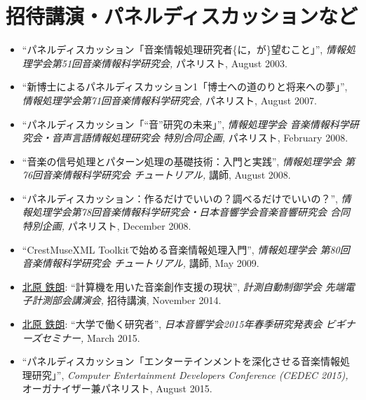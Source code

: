   \section*{招待講演・パネルディスカッションなど}
   \begin{itemize}
   
\item 

    ``パネルディスカッション「音楽情報処理研究者\{に，が\}望むこと」'', 
    {\it 情報処理学会第51回音楽情報科学研究会,
    } パネリスト, August 2003. 

\item 

    ``新博士によるパネルディスカッション1「博士への道のりと将来への夢」'', 
    {\it 情報処理学会第71回音楽情報科学研究会,
    } パネリスト, August 2007. 

\item 

    ``パネルディスカッション「``音''研究の未来」'', 
    {\it 情報処理学会 音楽情報科学研究会・音声言語情報処理研究会 特別合同企画,
    } パネリスト, February 2008. 

\item 

    ``音楽の信号処理とパターン処理の基礎技術：入門と実践'', 
    {\it 情報処理学会 第76回音楽情報科学研究会 チュートリアル,
    } 講師, August 2008. 

\item 

    ``パネルディスカッション：作るだけでいいの？調べるだけでいいの？'', 
    {\it 情報処理学会第78回音楽情報科学研究会・日本音響学会音楽音響研究会 合同特別企画,
    } パネリスト, December 2008. 

\item 

    ``CrestMuseXML Toolkitで始める音楽情報処理入門'', 
    {\it 情報処理学会 第80回音楽情報科学研究会 チュートリアル,
    } 講師, May 2009. 

\item 
\underline{北原 鉄朗}: 
    ``計算機を用いた音楽創作支援の現状'', 
    {\it 計測自動制御学会 先端電子計測部会講演会,
    } 招待講演, November 2014. 

\item 
\underline{北原 鉄朗}: 
    ``大学で働く研究者'', 
    {\it 日本音響学会2015年春季研究発表会 ビギナーズセミナー,
    } March 2015. 

\item 

    ``パネルディスカッション「エンターテインメントを深化させる音楽情報処理研究」'', 
    {\it Computer Entertainment Developers Conference (CEDEC 2015),
    } オーガナイザー兼パネリスト, August 2015. 


\end{itemize}
